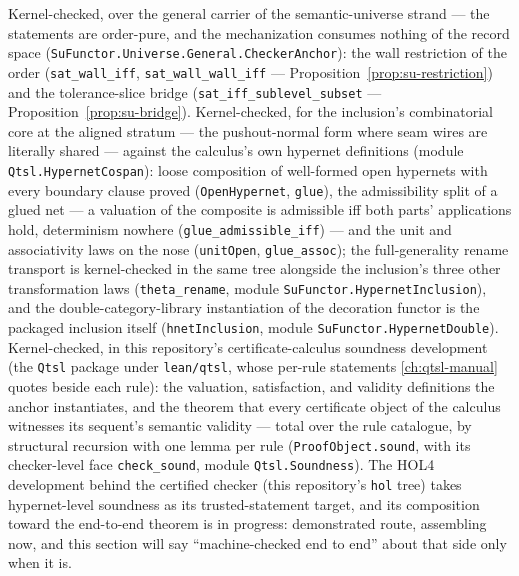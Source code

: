 \begin{remark}
\label{rem:su-checker-anchor-mechanized}
Kernel-checked, over the general carrier of the semantic-universe
strand --- the statements are order-pure, and the mechanization
consumes nothing of the record space
(\texttt{SuFunctor.Universe.General.CheckerAnchor}): the wall
restriction of the order
(\texttt{sat\_wall\_iff}, \texttt{sat\_wall\_wall\_iff} ---
Proposition~\ref{prop:su-restriction}) and the
tolerance-slice bridge (\texttt{sat\_iff\_sublevel\_subset} ---
Proposition~\ref{prop:su-bridge}). Kernel-checked, for the
inclusion's combinatorial core at the aligned stratum --- the
pushout-normal form where seam wires are literally shared ---
against the calculus's own hypernet definitions (module
\texttt{Qtsl.HypernetCospan}): loose composition of well-formed
open hypernets with every boundary clause proved
(\texttt{OpenHypernet}, \texttt{glue}), the admissibility split of
a glued net --- a valuation of the composite is admissible iff both
parts' applications hold, determinism nowhere
(\texttt{glue\_admissible\_iff}) --- and the unit and associativity
laws on the nose (\texttt{unitOpen}, \texttt{glue\_assoc}); the
full-generality rename transport is kernel-checked in the same tree
alongside the inclusion's three other transformation laws
(\texttt{theta\_rename}, module
\texttt{SuFunctor.HypernetInclusion}), and the
double-category-library instantiation of the decoration functor is
the packaged inclusion itself (\texttt{hnetInclusion}, module
\texttt{SuFunctor.HypernetDouble}). Kernel-checked, in this
repository's certificate-calculus soundness
development (the \texttt{Qtsl} package under \texttt{lean/qtsl},
whose per-rule statements \autoref{ch:qtsl-manual} quotes
beside each rule): the valuation, satisfaction, and validity
definitions the anchor instantiates, and the theorem that every
certificate object of the calculus witnesses its sequent's semantic
validity --- total over the rule catalogue, by structural recursion
with one lemma per rule (\texttt{ProofObject.sound}, with its
checker-level face \texttt{check\_sound}, module
\texttt{Qtsl.Soundness}).
The HOL4 development behind the certified checker (this repository's
\texttt{hol} tree) takes hypernet-level soundness as
its trusted-statement target, and its composition toward the
end-to-end theorem is in progress: demonstrated route, assembling
now, and this section will say ``machine-checked end to end''
about that side only when it is.
\end{remark}

